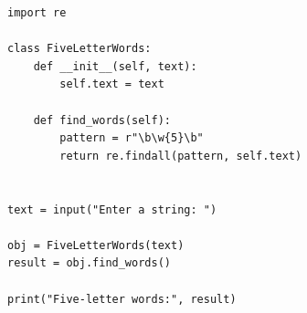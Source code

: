 \begin{verbatim}
import re

class FiveLetterWords:
    def __init__(self, text):
        self.text = text

    def find_words(self):
        pattern = r"\b\w{5}\b"
        return re.findall(pattern, self.text)


text = input("Enter a string: ")

obj = FiveLetterWords(text)
result = obj.find_words()

print("Five-letter words:", result)
\end{verbatim}
